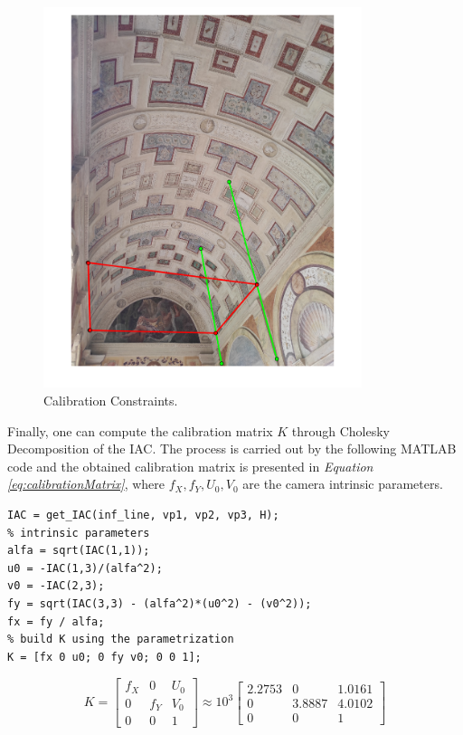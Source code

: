 \documentclass[12pt,a4paper]{article}
\begin{document}
\begin{figure}[H]
    \centering
    \includegraphics[width=0.83\textwidth]{Images/PalazzoTe_IAC_constraints.png}
    \caption[Calibration Constraints.]{Calibration Constraints.}
    \label{fig:calibConstraints}
\end{figure}

Finally, one can compute the calibration matrix $K$ through Cholesky Decomposition of the IAC. The process is carried out by the following MATLAB code and the obtained calibration matrix is presented in \textit{Equation \ref{eq:calibrationMatrix}}, where $f_X,f_Y,U_0,V_0$ are the camera intrinsic parameters.

\begin{verbatim}
IAC = get_IAC(inf_line, vp1, vp2, vp3, H);
% intrinsic parameters
alfa = sqrt(IAC(1,1));
u0 = -IAC(1,3)/(alfa^2);
v0 = -IAC(2,3);
fy = sqrt(IAC(3,3) - (alfa^2)*(u0^2) - (v0^2));
fx = fy / alfa;
% build K using the parametrization
K = [fx 0 u0; 0 fy v0; 0 0 1];
\end{verbatim}

\begin{equation}
    K =
    \begin{bmatrix}
    f_X & 0 & U_0\\
    0 & f_Y & V_0\\
    0 & 0 & 1
    \end{bmatrix}
    \approx 10^3
    \begin{bmatrix}
    2.2753 & 0 & 1.0161\\
    0 & 3.8887 & 4.0102\\
    0 & 0 & 1
    \end{bmatrix}
    \label{eq:calibrationMatrix}
\end{equation}
\bigskip
\end{document}
